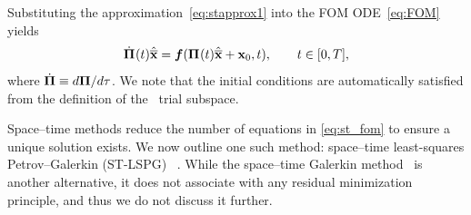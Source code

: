 \documentclass[3p,computermodern,10pt]{elsarticle}
\begin{document}
Substituting the approximation~\eqref{eq:stapprox1} into the FOM
ODE~\eqref{eq:FOM} yields
\begin{equation}\label{eq:st_fom}
\dot{\boldsymbol \Pi}^{}(t) \hat{\mathbf{\overline{x}}} =  \boldsymbol f(\boldsymbol \Pi^{}(t) \hat{\mathbf{\overline{x}}} +
	{{\mathbf{x}}_0},t) , \qquad t \in [0,T],
\end{equation}
where 
$\dot{\boldsymbol \Pi}\equiv d\boldsymbol \Pi/d\tau$. We note that the initial conditions
are automatically satisfied from the definition of the \spaceTimeAcronym\
trial subspace.

Space--time methods reduce the number of equations in
\eqref{eq:st_fom} to ensure a unique solution exists.
We now outline one such method: space--time least-squares Petrov--Galerkin (ST-LSPG)
~\cite{choi_stlspg}. 
While the space--time Galerkin method~\cite{benner_st} is another alternative, it does not
associate with any residual minimization principle, and thus we do not discuss
it further.
\end{document}
